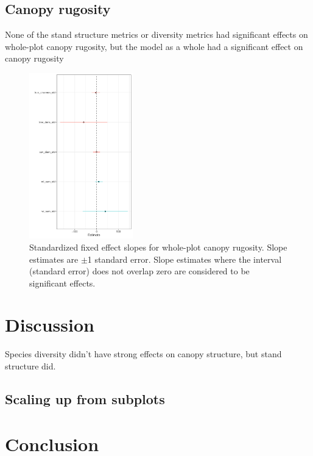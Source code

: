 \documentclass[11pt,a4paper]{article}
\newcommand{\beginsupplement}{%
	\setcounter{table}{0}
	\renewcommand{\thetable}{S\arabic{table}}%
	\setcounter{figure}{0}
	\renewcommand{\thefigure}{S\arabic{figure}}%
}
\begin{document}
\subsection{Canopy rugosity}

None of the stand structure metrics or diversity metrics had significant effects on whole-plot canopy rugosity, but the model as a whole had a significant effect on canopy rugosity

\begin{figure}[H]
\centering
	\includegraphics[width=0.4\textwidth]{rugosity_mod_slopes}
	\caption{Standardized fixed effect slopes for whole-plot canopy rugosity. Slope estimates are $\pm$1 standard error. Slope estimates where the interval (standard error) does not overlap zero are considered to be significant effects.}
	\label{rugosity_mod_slopes}
\end{figure}

\section{Discussion}

Species diversity didn't have strong effects on canopy structure, but stand structure did.

\subsection{Scaling up from subplots}

\section{Conclusion}

\printbibliography

\end{document}
